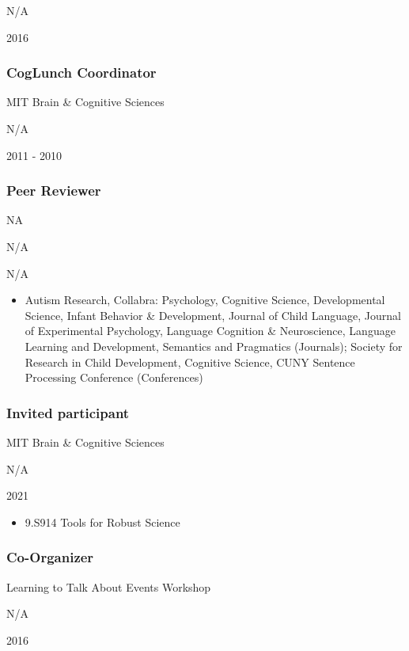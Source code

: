 \documentclass[
]{article}
\providecommand{\tightlist}{%
  \setlength{\itemsep}{0pt}\setlength{\parskip}{0pt}}
\begin{document}
N/A

2016

\hypertarget{coglunch-coordinator}{%
\subsubsection{CogLunch Coordinator}\label{coglunch-coordinator}}

MIT Brain \& Cognitive Sciences

N/A

2011 - 2010

\hypertarget{peer-reviewer}{%
\subsubsection{Peer Reviewer}\label{peer-reviewer}}

NA

N/A

N/A

\begin{itemize}
\tightlist
\item
  Autism Research, Collabra: Psychology, Cognitive Science,
  Developmental Science, Infant Behavior \& Development, Journal of
  Child Language, Journal of Experimental Psychology, Language Cognition
  \& Neuroscience, Language Learning and Development, Semantics and
  Pragmatics (Journals); Society for Research in Child Development,
  Cognitive Science, CUNY Sentence Processing Conference (Conferences)
\end{itemize}

\hypertarget{invited-participant}{%
\subsubsection{Invited participant}\label{invited-participant}}

MIT Brain \& Cognitive Sciences

N/A

2021

\begin{itemize}
\tightlist
\item
  9.S914 Tools for Robust Science
\end{itemize}

\hypertarget{co-organizer}{%
\subsubsection{Co-Organizer}\label{co-organizer}}

Learning to Talk About Events Workshop

N/A

2016
\end{document}
